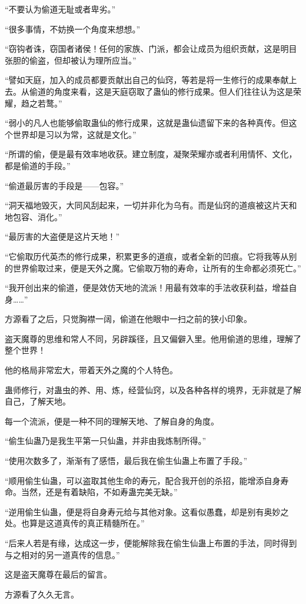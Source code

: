 \begin{this_body}
“不要认为偷道无耻或者卑劣。”

“很多事情，不妨换一个角度来想想。”

“窃钩者诛，窃国者诸侯！任何的家族、门派，都会让成员为组织贡献，这是明目张胆的偷盗，但却被认为理所应当。”

“譬如天庭，加入的成员都要贡献出自己的仙窍，等若是将一生修行的成果奉献上去。从偷道的角度来看，这是天庭窃取了蛊仙的修行成果。但人们往往认为这是荣耀，趋之若鹜。”

“弱小的凡人也能够偷取蛊仙的修行成果，这就是蛊仙遗留下来的各种真传。但这个世界却是习以为常，这就是文化。”

“所谓的偷，便是最有效率地收获。建立制度，凝聚荣耀亦或者利用情怀、文化，都是偷道的手段。”

“偷道最厉害的手段是——包容。”

“洞天福地毁灭，大同风刮起来，一切并非化为乌有。而是仙窍的道痕被这片天和地包容、消化。”

“最厉害的大盗便是这片天地！”

“它偷取历代英杰的修行成果，积累更多的道痕，或者全新的凹痕。它将我等从别的世界偷取过来，便是天外之魔。它偷取万物的寿命，让所有的生命都必须死亡。”

“我开创出来的偷道，便是效仿天地的流派！用最有效率的手法收获利益，增益自身……”

方源看了之后，只觉胸襟一阔，偷道在他眼中一扫之前的狭小印象。

盗天魔尊的思维和常人不同，另辟蹊径，且又偏僻入里。他用偷道的思维，理解了整个世界！

他的格局非常宏大，带着天外之魔的个人特色。

蛊师修行，对蛊虫的养、用、炼，经营仙窍，以及各种各样的境界，无非就是了解自己，了解天地。

每一个流派，便是一种不同的理解天地、了解自身的角度。

“偷生仙蛊乃是我生平第一只仙蛊，并非由我炼制所得。”

“使用次数多了，渐渐有了感悟，最后我在偷生仙蛊上布置了手段。”

“顺用偷生仙蛊，可以盗取其他生命的寿元，配合我开创的杀招，能增添自身寿命。当然，还是有着缺陷，不如寿蛊完美无缺。”

“逆用偷生仙蛊，便是将自身寿元给与其他对象。这看似愚蠢，却是别有奥妙之处。也算是这道真传的真正精髓所在。”

“后来人若是有缘，达成这一步，便能解除我在偷生仙蛊上布置的手法，同时得到与之相对的另一道真传的信息。”

这是盗天魔尊在最后的留言。

方源看了久久无言。


\end{this_body}

